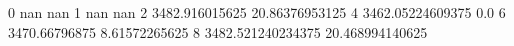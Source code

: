 0 nan nan
1 nan nan
2 3482.916015625 20.86376953125
4 3462.05224609375 0.0
6 3470.66796875 8.61572265625
8 3482.521240234375 20.468994140625
